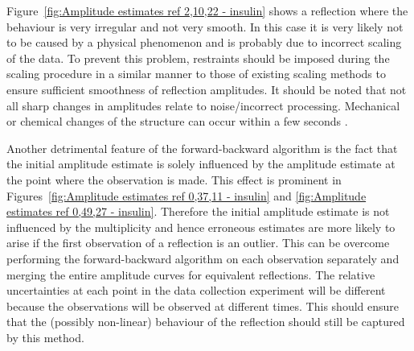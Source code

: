 Figure~\ref{fig:Amplitude estimates ref 2,10,22 - insulin} shows a reflection where the behaviour is very irregular and not very smooth.
In this case it is very likely not to be caused by a physical phenomenon and is probably due to incorrect scaling of the data.
To prevent this problem, restraints should be imposed during the scaling procedure in a similar manner to those of existing scaling methods to ensure sufficient smoothness of reflection amplitudes\cite{evans2013,kabsch2010integration}.
It should be noted that not all sharp changes in amplitudes relate to noise/incorrect processing.
Mechanical or chemical changes of the structure can occur within a few seconds \cite{allan2012}.

Another detrimental feature of the forward-backward algorithm is the fact that the initial amplitude estimate is solely influenced by the amplitude estimate at the point where the observation is made.
This effect is prominent in Figures~\ref{fig:Amplitude estimates ref 0,37,11 - insulin} and \ref{fig:Amplitude estimates ref 0,49,27 - insulin}.
Therefore the initial amplitude estimate is not influenced by the multiplicity and hence erroneous estimates are more likely to arise if the first observation of a reflection is an outlier.
This can be overcome performing the forward-backward algorithm on each observation separately and merging the entire amplitude curves for equivalent reflections.
The relative uncertainties at each point in the data collection experiment will be different because the observations will be observed at different times.
This should ensure that the (possibly non-linear) behaviour of the reflection should still be captured by this method.
